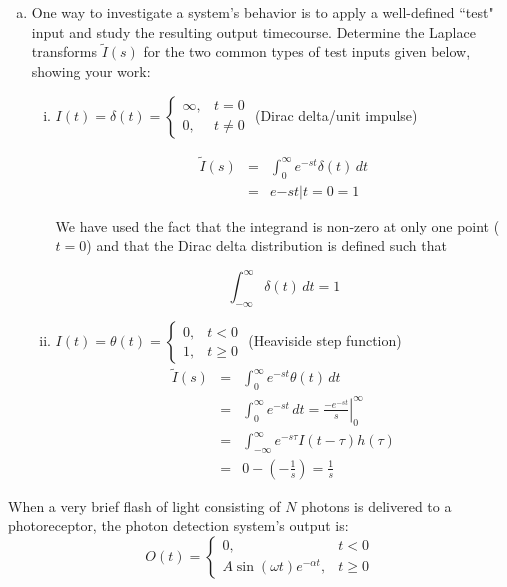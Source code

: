 \documentclass{article}
\begin{document}
\begin{enumerate}[a)]
\item One way to investigate a system's behavior is to apply a well-defined ``test" input and study the resulting output timecourse. Determine the Laplace transforms $\tilde{I}(s)$ for the two common types of test inputs given below, showing your work:
\begin{enumerate}[i)]
\setlength{\itemsep}{0pt}
\item  $I(t) = \delta(t)= \left\{
     \begin{array}{lr}
       \infty, & t = 0 \\
       0, & t \neq 0
     \end{array}
   \right.$ (Dirac delta/unit impulse)\\
   
{\color{red}
\begin{eqnarray*}
 \tilde{I}(s) & = & \int_{0}^{\infty} e^{-st} \delta(t) \, dt\\
 & = & \left. e{-st} \right|{t=0} = 1
 \end{eqnarray*}
 
We have used the fact that the integrand is non-zero at only one point ($t=0$) and that the Dirac delta distribution is defined such that

\[ \int_{-\infty}^{\infty} \delta(t) \, dt = 1 \]
}   
   
   
\item  $I(t) = \theta(t)= \left\{
     \begin{array}{lr}
       0, & t < 0 \\
       1, & t \geq 0
     \end{array}
   \right.$ (Heaviside step function)\\
   
{\color{red}
\begin{eqnarray*}
 \tilde{I}(s) & = & \int_{0}^{\infty} e^{-st} \theta(t) \, dt\\
 & = & \int_{0}^{\infty} e^{-st} \, dt = \left. \frac{-e^{-st}}{s} \right|_0^{\infty}\\
 & = & \int_{-\infty}^{\infty} e^{-s\tau} I(t-\tau) h(\tau)\\
 & = & 0 - \left(-\frac{1}{s} \right) = \frac{1}{s}
 \end{eqnarray*}
}      
   
   
\end{enumerate}
\end{enumerate}
When a very brief flash of light consisting of $N$ photons is delivered to a photoreceptor, the photon detection system's output is:
\[ O(t) = \left\{
     \begin{array}{lr}
       0, & t < 0 \\
       A \sin \left( \omega t \right) e^{-\alpha t}, & t \geq 0
     \end{array}
   \right. \]   
\end{document}
